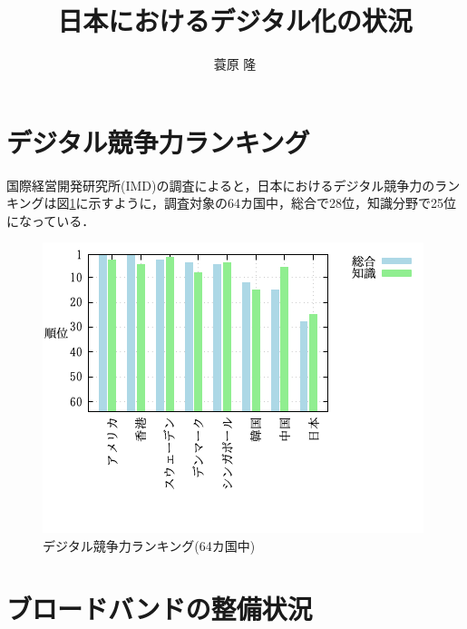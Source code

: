 \documentclass[a4paper,11pt,dvipdfmx]{ujarticle}
\title{日本におけるデジタル化の状況}
\author{蓑原 隆}
\begin{document}
\maketitle %

\section{デジタル競争力ランキング}

国際経営開発研究所(IMD)の調査\cite{imd}によると，日本におけるデジタル競争力のランキングは図\ref{fig:ranking}に示すように，調査対象の64カ国中，総合で28位，知識分野で25位になっている．


\begin{figure}[htbp]
    \centering
    \includegraphics{fig31.png}
    \caption{デジタル競争力ランキング(64カ国中)}
    \label{fig:ranking}
\end{figure}


\section{ブロードバンドの整備状況}
\end{document}
